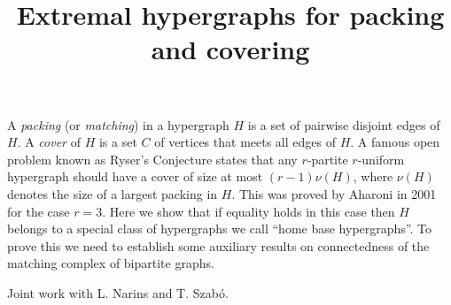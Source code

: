 \title{Extremal hypergraphs for packing and covering}
\endtitle

A {\it packing} (or {\it matching}) in a hypergraph $H$ is a set of pairwise 
disjoint edges of $H$. A {\it cover} of $H$ is a set $C$ of vertices that
meets all edges of $H$. A famous open problem known as Ryser's
Conjecture states that 
any $r$-partite $r$-uniform hypergraph should have a cover of size at
most $(r-1)\nu(H)$, where $\nu(H)$ denotes the size of a largest
packing in $H$. This was proved by Aharoni in 2001 for the case
$r=3$. Here we show that if equality holds in this case then $H$
belongs to a special class of hypergraphs we call ``home base
hypergraphs''. To prove this we need to establish some
auxiliary results on connectedness of the matching complex of bipartite graphs.

Joint work with L. Narins and T. Szab\'o. 